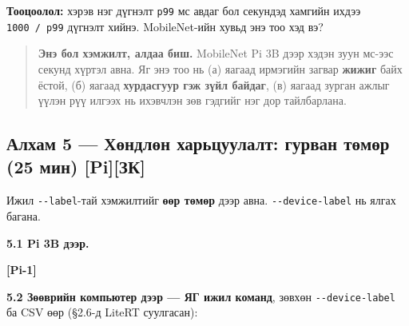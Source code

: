 \textbf{Тооцоолол:} хэрэв нэг дүгнэлт \texttt{p99} мс авдаг бол секундэд хамгийн ихдээ \texttt{1000\ /\ p99} дүгнэлт хийнэ. MobileNet-ийн хувьд энэ тоо хэд вэ?

\begin{quote}
\textbf{Энэ бол хэмжилт, алдаа биш.} MobileNet Pi 3B дээр хэдэн зуун мс-ээс секунд хүртэл авна. Яг энэ тоо нь (а) яагаад ирмэгийн загвар \textbf{жижиг} байх ёстой, (б) яагаад \textbf{хурдасгуур гэж зүйл байдаг}, (в) яагаад зурган ажлыг үүлэн рүү илгээх нь ихэвчлэн зөв гэдгийг нэг дор тайлбарлана.
\end{quote}

\hypertarget{ux430ux43bux445ux430ux43c-5-ux445ux4e9ux43dux434ux43bux4e9ux43d-ux445ux430ux440ux44cux446ux443ux443ux43bux430ux43bux442-ux433ux443ux440ux432ux430ux43d-ux442ux4e9ux43cux4e9ux440-25-ux43cux438ux43d-piux437ux43a}{%
\subsection{Алхам 5 --- Хөндлөн харьцуулалт: гурван төмөр (25 мин) {[}Pi{]}{[}ЗК{]}}\label{ux430ux43bux445ux430ux43c-5-ux445ux4e9ux43dux434ux43bux4e9ux43d-ux445ux430ux440ux44cux446ux443ux443ux43bux430ux43bux442-ux433ux443ux440ux432ux430ux43d-ux442ux4e9ux43cux4e9ux440-25-ux43cux438ux43d-piux437ux43a}}

Ижил \texttt{-\/-label}-тай хэмжилтийг \textbf{өөр төмөр} дээр авна. \texttt{-\/-device-label} нь ялгах багана.

\textbf{5.1 Pi 3B дээр.}

\textbf{{[}Pi-1{]}}

\begin{Shaded}
\begin{Highlighting}[]
 \KeywordTok{\textbackslash{}}
 \KeywordTok{\textbackslash{}}
\end{Highlighting}
\end{Shaded}

\textbf{5.2 Зөөврийн компьютер дээр --- ЯГ ижил команд}, зөвхөн \texttt{-\/-device-label} ба CSV өөр (§2.6-д LiteRT суулгасан):

